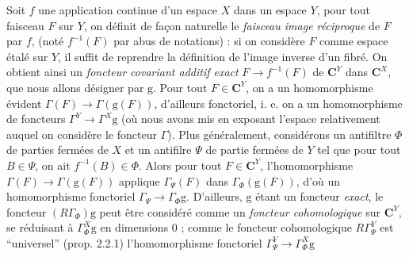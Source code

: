 Soit $f$ une application continue d'un espace $X$ dans un espace $Y$, pour
tout faisceau $F$ sur $Y$, on définit de façon naturelle le \textit{faisceau
image réciproque} de $F$ par $f$, (noté $f^{-1}(F)$ par abus de notations) :
si on considère $F$ comme espace étalé sur $Y$, il suffit de reprendre la
définition de l'image inverse d'un fibré. On obtient ainsi un \textit{foncteur
covariant additif exact} $F\to f^{-1}(F)$ de $\mathbf C^Y$ dans $\mathbf C^X$, que
nous allons désigner par $\mathrm{g}$. Pour tout $F\in \mathbf C^Y$, on a un homomorphisme
évident $\Gamma(F)\to\Gamma(\mathrm{g}(F))$, d'ailleurs fonctoriel, i. e.
on a un homomorphisme de foncteurs
$\Gamma^Y\to\Gamma^X\mathrm{g}$ (où nous avons mis en exposant l'espace
relativement auquel on considère le foncteur $\Gamma$). Plus généralement,
considérons un antifiltre $\Phi$ de parties fermées de $X$ et un antifilre
$\Psi$ de partie fermées de $Y$ tel que pour tout $B\in\Psi$, on ait
$f^{-1}(B)\in\Phi$. Alors pour tout $F\in \mathbf C^Y$, l'homomorphisme
$\Gamma(F)\to\Gamma(\mathrm{g}(F))$ applique $\Gamma_\Psi(F)$ dans
$\Gamma_\Phi(\mathrm{g}(F))$, d'où un homomorphisme fonctoriel
$\Gamma_\Psi\to\Gamma_\Phi \mathrm{g}$. D'ailleurs, $\mathrm{g}$ étant un
foncteur \textit{exact}, le foncteur $(R\Gamma_\Phi)\mathrm{g}$ peut être considéré comme un
\textit{foncteur cohomologique} sur $\mathbf C^Y$, se réduisant à $\Gamma^X_\Phi \mathrm{g}$ en
dimensions 0 ; comme le foncteur cohomologique $R\Gamma^Y_\Psi$ est
``universel'' (prop. 2.2.1) l'homomorphisme fonctoriel
$\Gamma^Y_\Psi\to\Gamma^X_\Phi \mathrm{g}$


